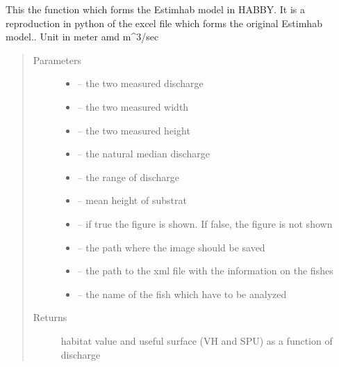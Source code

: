 \documentclass[letterpaper,10pt,english]{sphinxmanual}
\begin{document}
\begin{fulllineitems}
\label{\detokenize{index:src.estimhab.estimhab}}
This the function which forms the Estimhab model in HABBY. It is a reproduction in python of the excel file which
forms the original Estimhab model.. Unit in meter amd m\textasciicircum{}3/sec
\begin{quote}\begin{description}
\item[{Parameters}] \leavevmode\begin{itemize}
\item {} 
 -- the two measured discharge

\item {} 
 -- the two measured width

\item {} 
 -- the two measured height

\item {} 
 -- the natural median discharge

\item {} 
 -- the range of discharge

\item {} 
 -- mean height of substrat

\item {} 
 -- if true the figure is shown. If false, the figure is not shown

\item {} 
 -- the path where the image should be saved

\item {} 
 -- the path to the xml file with the information on the fishes

\item {} 
 -- the name of the fish which have to be analyzed

\end{itemize}

\item[{Returns}] \leavevmode
habitat value and useful surface (VH and SPU) as a function of discharge


\end{description}
\end{quote}
\end{fulllineitems}
\end{document}
